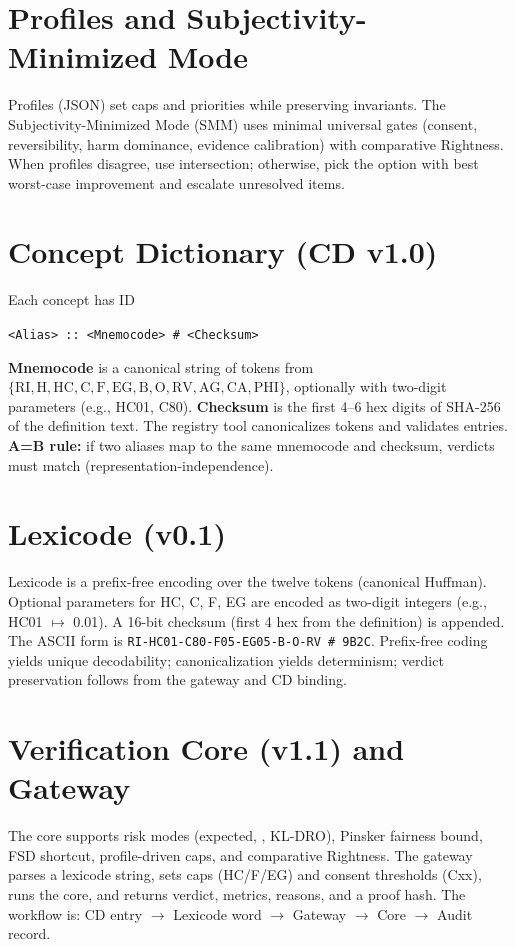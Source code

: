 \documentclass[11pt]{article}
\newcommand{\CVaR}{\mathrm{CVaR}}
\theoremstyle{plain}
\theoremstyle{definition}
\begin{document}
\section{Profiles and Subjectivity-Minimized Mode}
Profiles (JSON) set caps and priorities while preserving invariants. The Subjectivity-Minimized Mode (SMM) uses minimal universal gates (consent, reversibility, harm dominance, evidence calibration) with comparative Rightness. When profiles disagree, use intersection; otherwise, pick the option with best worst-case improvement and escalate unresolved items.

\section{Concept Dictionary (CD v1.0)}
Each concept has ID
\begin{center}
\texttt{\textless Alias\textgreater\ :: \textless Mnemocode\textgreater\ \# \textless Checksum\textgreater}
\end{center}
\textbf{Mnemocode} is a canonical string of tokens from $\{\mathrm{RI},\mathrm{H},\mathrm{HC},\mathrm{C},\mathrm{F},\mathrm{EG},\mathrm{B},\mathrm{O},\mathrm{RV},\mathrm{AG},\mathrm{CA},\mathrm{PHI}\}$, optionally with two-digit parameters (e.g., HC01, C80). \textbf{Checksum} is the first 4--6 hex digits of SHA-256 of the definition text. The registry tool canonicalizes tokens and validates entries.\\
\textbf{A=B rule:} if two aliases map to the same mnemocode and checksum, verdicts must match (representation-independence).

\section{Lexicode (v0.1)}
Lexicode is a prefix-free encoding over the twelve tokens (canonical Huffman). Optional parameters for HC, C, F, EG are encoded as two-digit integers (e.g., HC01 $\mapsto$ 0.01). A 16-bit checksum (first 4 hex from the definition) is appended. The ASCII form is \texttt{RI-HC01-C80-F05-EG05-B-O-RV \# 9B2C}. Prefix-free coding yields unique decodability; canonicalization yields determinism; verdict preservation follows from the gateway and CD binding.

\section{Verification Core (v1.1) and Gateway}
The core supports risk modes (expected, \CVaR, KL-DRO), Pinsker fairness bound, FSD shortcut, profile-driven caps, and comparative Rightness. The gateway parses a lexicode string, sets caps (HC/F/EG) and consent thresholds (Cxx), runs the core, and returns verdict, metrics, reasons, and a proof hash. The workflow is: CD entry $\to$ Lexicode word $\to$ Gateway $\to$ Core $\to$ Audit record.
\end{document}
